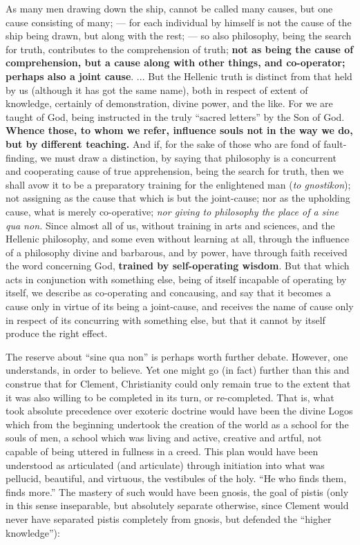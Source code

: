 \begin{quotex}
As many men drawing down the ship, cannot be called many causes, but one cause consisting of many; --- for each individual by himself is not the cause of the ship being drawn, but along with the rest; --- so also philosophy, being the search for truth, contributes to the comprehension of truth; \textbf{not as being the cause of comprehension, but a cause along with other things, and co-operator; perhaps also a joint cause}. ... But the Hellenic truth is distinct from that held by us (although it has got the same name), both in respect of extent of knowledge, certainly of demonstration, divine power, and the like. For we are taught of God, being instructed in the truly ``sacred letters'' by the Son of God. \textbf{Whence those, to whom we refer, influence souls not in the way we do, but by different teaching.} And if, for the sake of those who are fond of fault-finding, we must draw a distinction, by saying that philosophy is a concurrent and cooperating cause of true apprehension, being the search for truth, then we shall avow it to be a preparatory training for the enlightened man (\emph{to gnostikon}); not assigning as the cause that which is but the joint-cause; nor as the upholding cause, what is merely co-operative; \emph{nor giving to philosophy the place of a sine qua non.} Since almost all of us, without training in arts and sciences, and the Hellenic philosophy, and some even without learning at all, through the influence of a philosophy divine and barbarous, and by power, have through faith received the word concerning God, \textbf{trained by self-operating wisdom}. But that which acts in conjunction with something else, being of itself incapable of operating by itself, we describe as co-operating and concausing, and say that it becomes a cause only in virtue of its being a joint-cause, and receives the name of cause only in respect of its concurring with something else, but that it cannot by itself produce the right effect.
\end{quotex}


The reserve about ``sine qua non'' is perhaps worth further debate. However, one understands, in order to believe. Yet one might go (in fact) further than this and construe that for Clement, Christianity could only remain true to the extent that it was also willing to be completed in its turn, or re-completed. That is, what took absolute precedence over exoteric doctrine would have been the divine Logos which from the beginning undertook the creation of the world as a school for the souls of men, a school which was living and active, creative and artful, not capable of being uttered in fullness in a creed. This plan would have been understood as articulated (and articulate) through initiation into what was pellucid, beautiful, and virtuous, the vestibules of the holy. ``He who finds them, finds more.'' The mastery of such would have been gnosis, the goal of pistis (only in this sense inseparable, but absolutely separate otherwise, since Clement would never have separated pistis completely from gnosis, but defended the ``higher knowledge''):

